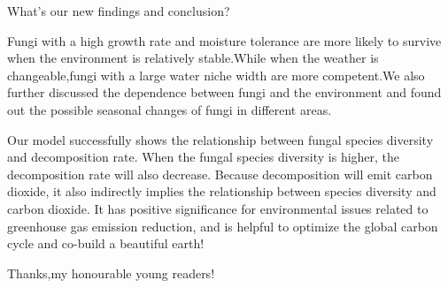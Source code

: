 \documentclass[12pt]{article}
\begin{document}
What’s our new findings and conclusion?\par 
Fungi with a high growth rate and moisture tolerance are more likely to survive when the environment is relatively stable.While when the weather is changeable,fungi with a large water niche width are more competent.We also further discussed the dependence between fungi and the   environment and found out the possible seasonal changes of fungi in different areas.\par 
Our model successfully shows the relationship between fungal species diversity and decomposition rate. When the fungal species diversity is higher, the decomposition rate will also decrease. Because decomposition will emit carbon dioxide, it also indirectly implies the relationship between species diversity and carbon dioxide. It has positive significance for environmental issues related to greenhouse gas emission reduction, and is helpful to optimize the global carbon cycle and co-build a beautiful earth!\par 
Thanks,my honourable young readers!\par 
\end{document}
